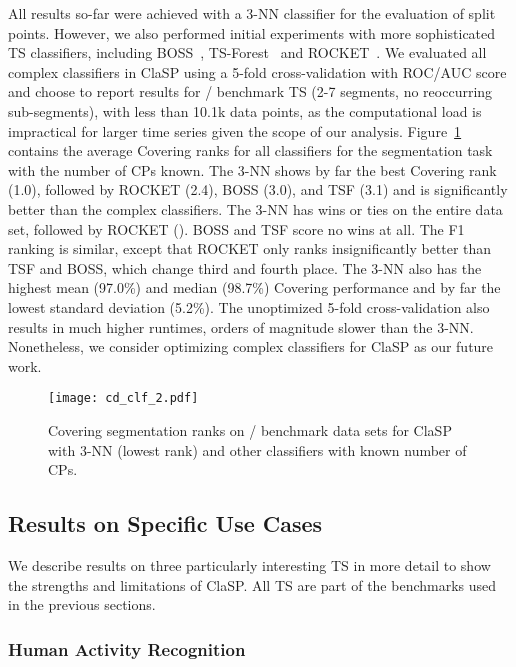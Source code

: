 \documentclass[pdflatex,sn-basic]{sn-jnl}
\begin{document}
All results so-far were achieved with a 3-NN classifier for the evaluation of split points. However, we also performed initial experiments with more sophisticated TS classifiers, including BOSS~\citep{schafer2014boss}, TS-Forest~\citep{deng2013time} and ROCKET~\citep{dempster2020rocket}. We evaluated all complex classifiers in ClaSP using a 5-fold cross-validation with ROC/AUC score and choose to report results for / benchmark TS (2-7 segments, no reoccurring sub-segments), with less than 10.1k data points, as the computational load is impractical for larger time series given the scope of our analysis. Figure~\ref{fig:cd_clf} contains the average Covering ranks for all classifiers for the segmentation task with the number of CPs known. The 3-NN shows by far the best Covering rank (1.0), followed by ROCKET (2.4), BOSS (3.0), and TSF (3.1) and is significantly better than the complex classifiers. The 3-NN has  wins or ties on the entire data set, followed by ROCKET (). BOSS and TSF score no wins at all. The F1 ranking is similar, except that ROCKET only ranks insignificantly better than TSF and BOSS, which change third and fourth place. The 3-NN also has the highest mean (97.0\%) and median (98.7\%) Covering performance and by far the lowest standard deviation (5.2\%). The unoptimized 5-fold cross-validation also results in much higher runtimes, orders of magnitude slower than the 3-NN. Nonetheless, we consider optimizing complex classifiers for ClaSP as our future work.

\begin{figure}[t]
	\texttt{[image: cd\_clf\_2.pdf]}
	\caption{Covering segmentation ranks on / benchmark data sets for ClaSP with 3-NN (lowest rank) and other classifiers with known number of CPs.\label{fig:cd_clf}
	}
\end{figure}


\subsection{Results on Specific Use Cases}\label{sec:use_cases}

We describe results on three particularly interesting TS in more detail to show the strengths and limitations of ClaSP. All TS are part of the benchmarks used in the previous sections. 

\subsubsection*{Human Activity Recognition}
\end{document}
